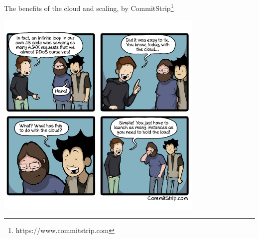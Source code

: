 \documentclass[a4paper,11pt]{exam}
\begin{document}
The benefits of the cloud and scaling, by CommitStrip\footnote{https://www.commitstrip.com}
\begin{center}
	\includegraphics[width=10cm]{fig/commitstripcloudscale.jpg}	
\end{center}
\end{document}
